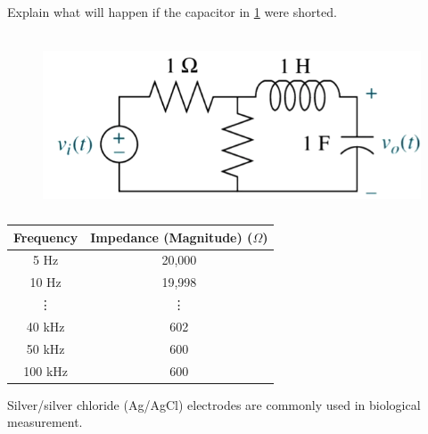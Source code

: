 \documentclass[12pt]{article}
\begin{document}
	\item Explain what will happen if the capacitor in \cref{fig:meshcircuit} were shorted. \\
	 \\

	\begin{figure}[H] %
		\centering
		\includegraphics{testfig}
		\caption{\rajah}
		\label{fig:meshcircuit}
	\end{figure}
	
	\begin{table}[H]
		\centering
		\caption{\jadual}
		\begin{tabular}{cc}
			\toprule
			\multicolumn{1}{l}{\textbf{Frequency}} & \multicolumn{1}{l}{\textbf{Impedance (Magnitude) ($\Omega$)}} \\
			\midrule
			5 Hz  & 20,000 \\
			10 Hz & 19,998 \\
			\vdots     & \vdots \\
			40 kHz & 602 \\
			50 kHz & 600 \\
			100 kHz & 600 \\
			\bottomrule
		\end{tabular}%
		\label{table:freqmag}%
	\end{table}%
\listclose %


\clearpage	%


\bigskip
\partQuestion

Silver/silver chloride (Ag/AgCl) electrodes are commonly used in biological measurement.
\end{document}
